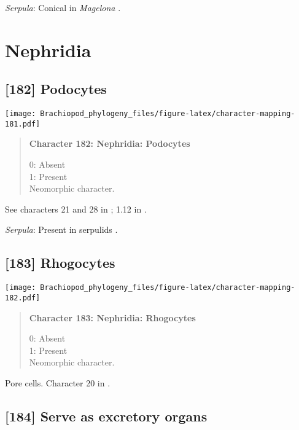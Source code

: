 \documentclass[openany]{book}
\theoremstyle{definition}
\theoremstyle{definition}
\theoremstyle{definition}
\theoremstyle{remark}
\begin{document}
\hypertarget{Serpula-coding-181}{}
\emph{Serpula}: Conical in \emph{Magelona} \citep{Bartolomaeus1995}.

\section{Nephridia}\label{nephridia}

\subsection*{{[}182{]} Podocytes}\label{podocytes}

\texttt{[image: Brachiopod\_phylogeny\_files/figure-latex/character-mapping-181.pdf]}

\begin{quote}
\textbf{Character 182: Nephridia: Podocytes}

0: Absent\\
1: Present\\
Neomorphic character.
\end{quote}

See characters 21 and 28 in \citet{Haszprunar2000}; 1.12 in
\citet{Scheltema1993}.

\hypertarget{Serpula-coding-182}{}
\emph{Serpula}: Present in serpulids \citep{Bartolomaeus2005}.

\subsection*{{[}183{]} Rhogocytes}\label{rhogocytes}

\texttt{[image: Brachiopod\_phylogeny\_files/figure-latex/character-mapping-182.pdf]}

\begin{quote}
\textbf{Character 183: Nephridia: Rhogocytes}

0: Absent\\
1: Present\\
Neomorphic character.
\end{quote}

Pore cells. Character 20 in \citet{Haszprunar2000}.

\subsection*{{[}184{]} Serve as excretory
organs}\label{serve-as-excretory-organs}
\end{document}
